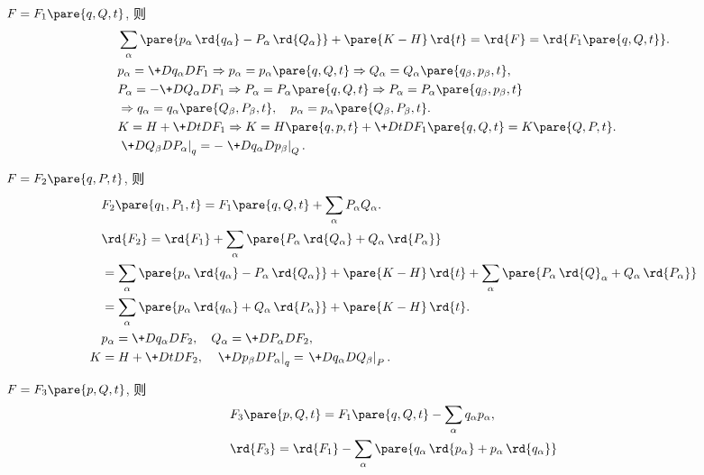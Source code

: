 \documentclass{ctexart}
\begin{document}
\begin{cenum}
    \item $F = F_1\pare{q,Q,t}$, 则
    \begin{align*}
        & \sum_{\alpha} \pare{p_\alpha\,\rd{q_\alpha} - P_\alpha \,\rd{Q_\alpha}} + \pare{K-H}\,\rd{t} = \rd{F} = \rd{F_1\pare{q,Q,t}}. \\
        & p_\alpha = \+D{q_\alpha}D{F_1} \Rightarrow p_\alpha = p_\alpha\pare{q,Q,t} \Rightarrow Q_\alpha = Q_\alpha\pare{q_\beta,p_\beta,t}, \\
        & P_\alpha = -\+D{Q_\alpha}D{F_1} \Rightarrow P_\alpha = P_\alpha\pare{q,Q,t} \Rightarrow P_\alpha = P_\alpha\pare{q_\beta,p_\beta,t} \\
        &\Rightarrow q_\alpha = q_\alpha\pare{Q_\beta,P_\beta,t},\quad p_\alpha = p_\alpha\pare{Q_\beta,P_\beta,t}. \\
        & K = H + \+DtD{F_1} \Rightarrow K = H\pare{q,p,t} + \+DtD{F_1\pare{q,Q,t}} = K\pare{Q,P,t}. \\
        & \left.\+D{Q_\beta}D{P_\alpha}\right\vert_q = -\left.\+D{q_\alpha}D{p_\beta}\right\vert_Q.
    \end{align*}
    \item $F=F_2\pare{q,P,t}$, 则
    \begin{align*}
        & F_2\pare{q_1,P_1,t} = F_1\pare{q,Q,t} + \sum_\alpha P_\alpha Q_\alpha. \\
        & \rd{F_2} = \rd{F_1} + \sum_\alpha \pare{P_\alpha\,\rd{Q_\alpha} + Q_\alpha\,\rd{P_\alpha}} \\
        &= \sum_\alpha\pare{p_\alpha\,\rd{q_\alpha} - P_\alpha\,\rd{Q_\alpha}} + \pare{K-H}\,\rd{t} + \sum_\alpha\pare{P_\alpha\,\rd{Q}_\alpha + Q_\alpha\,\rd{P_\alpha}} \\
        &= \sum_\alpha \pare{p_\alpha\,\rd{q_\alpha} + Q_\alpha\,\rd{P_\alpha}} + \pare{K-H}\,\rd{t}. \\
        & p_\alpha = \+D{q_\alpha}D{F_2}, \quad Q_\alpha = \+D{P_\alpha}D{F_2}, \\
        K &= H + \+DtD{F_2},\quad \left.\+D{p_\beta}D{P_\alpha}\right\vert_q = \left.\+D{q_\alpha}D{Q_\beta}\right\vert_P.
    \end{align*}
    \item $F=F_3\pare{p,Q,t}$, 则
    \begin{align*}
        & F_3\pare{p,Q,t} = F_1\pare{q,Q,t} - \sum_\alpha q_\alpha p_\alpha, \\
        & \rd{F_3} = \rd{F_1} - \sum_\alpha\pare{q_\alpha\,\rd{p_\alpha} + p_\alpha\,\rd{q_\alpha}} \\

\end{align*}
\end{cenum}
\end{document}
